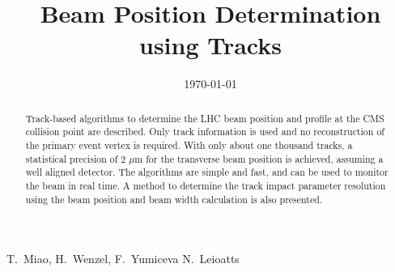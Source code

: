 \documentclass{cmspaper}
\begin{document}

\begin{titlepage}

   \date{\today}

  \title{Beam Position Determination using  Tracks
}

  \begin{Authlist}
    T.~Miao, H.~Wenzel, F.~Yumiceva
    N.~Leioatts
  \end{Authlist}


  \begin{abstract}
Track-based algorithms to determine the LHC beam position and profile at 
the CMS collision point are described. Only track information is 
used and no reconstruction of the primary event vertex is required. 
With only about one thousand tracks, a statistical precision of 2 $\mu$m  for the
transverse beam position is achieved,
assuming a well aligned detector. The algorithms are simple and
fast, and can be used to monitor the beam in real time.
A method to determine the track impact parameter resolution using the beam position and beam width calculation is also
presented. 


  \end{abstract} 

\end{titlepage}
\end{document}
